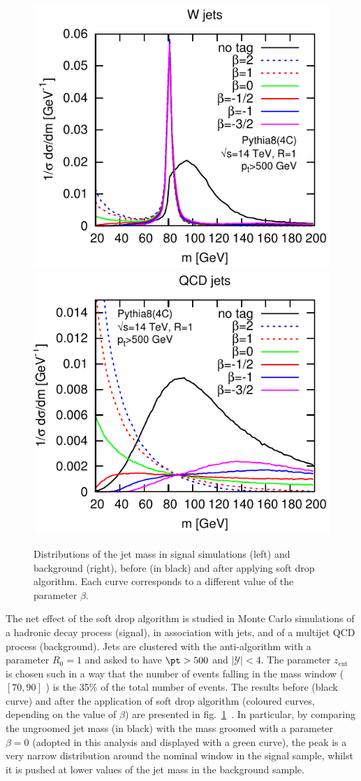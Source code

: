 \begin{figure}[!htb]
  \begin{center}
    \includegraphics[width=.495\textwidth]{figures/Wtagging_W_spectrum.pdf}
    \includegraphics[width=.495\textwidth]{figures/Wtagging_j_spectrum.pdf}
  \end{center}
  \caption{Distributions of the jet mass in signal simulations (left) and background (right), before (in black) and after applying soft drop algorithm. Each curve corresponds to a different value of the parameter $\beta$.~\cite{Larkoski:2014wba}}
  \label{fig:softdrop_original}
\end{figure}

\noindent The net effect of the soft drop algorithm is studied in Monte Carlo simulations of a \W hadronic decay process (signal), in association with jets, and of a multijet QCD process (background). Jets are clustered with the anti-\kt algorithm with a parameter $R_0 = 1$ and asked to have $\pt>500$ \GeV and $|\mathcal{Y}|<4$. The parameter $z_{\text{cut}}$ is chosen such in a way that the number of events falling in the \W mass window ($[70,90]$ \GeV) is the 35\% of the total number of events. The results before (black curve) and after the application of soft drop algorithm (coloured curves, depending on the value of $\beta$) are presented in fig.~\ref{fig:softdrop_original}~\cite{Larkoski:2014wba}. In particular, by comparing the ungroomed jet mass (in black) with the mass groomed with a parameter $\beta = 0$ (adopted in this analysis and displayed with a green curve), the \W peak is a very narrow distribution around the nominal \W window in the signal sample, whilst it is pushed at lower values of the jet mass in the background sample.


